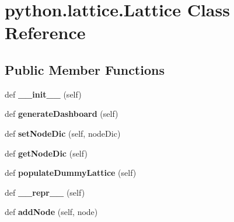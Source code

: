 \hypertarget{classpython_1_1lattice_1_1_lattice}{}\section{python.\+lattice.\+Lattice Class Reference}
\label{classpython_1_1lattice_1_1_lattice}
\subsection*{Public Member Functions}
\begin{DoxyCompactItemize}
\item 
\mbox{\label{classpython_1_1lattice_1_1_lattice_aa71e378de25e4d05e0c7205bbb0b453f}} 
def {\bfseries \+\_\+\+\_\+init\+\_\+\+\_\+} (self)
\item 
\mbox{\label{classpython_1_1lattice_1_1_lattice_aaa5ca64f6ee806115814b6af0666d5f3}} 
def {\bfseries generate\+Dashboard} (self)
\item 
\mbox{\label{classpython_1_1lattice_1_1_lattice_a34b0dda268ccabd0f3de304f10dd603e}} 
def {\bfseries set\+Node\+Dic} (self, node\+Dic)
\item 
\mbox{\label{classpython_1_1lattice_1_1_lattice_a5cd9366fa9285093b6b9c6223a4e2553}} 
def {\bfseries get\+Node\+Dic} (self)
\item 
\mbox{\label{classpython_1_1lattice_1_1_lattice_a07a4caffd5fa3ba706be13145c8b1868}} 
def {\bfseries populate\+Dummy\+Lattice} (self)
\item 
\mbox{\label{classpython_1_1lattice_1_1_lattice_a4a5abd5e2e53d27f021d80d08aed1d8d}} 
def {\bfseries \+\_\+\+\_\+repr\+\_\+\+\_\+} (self)
\item 
\mbox{\label{classpython_1_1lattice_1_1_lattice_aceab689944fe66206b7f1c104778c961}} 
def {\bfseries add\+Node} (self, node)
\item 
\mbox{\label{classpython_1_1lattice_1_1_lattice_ab9b71629e0ee5ba0c600d650469562ab}} 

\end{DoxyCompactItemize}
